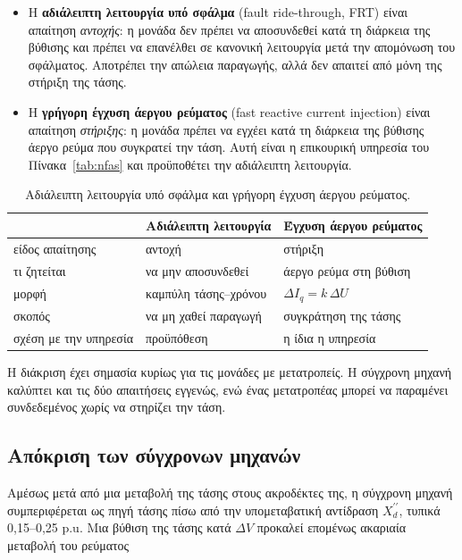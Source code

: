 \begin{itemize}
\item Η \textbf{αδιάλειπτη λειτουργία υπό σφάλμα} (fault ride-through, FRT) είναι
      απαίτηση \emph{αντοχής}: η μονάδα δεν πρέπει να αποσυνδεθεί κατά τη διάρκεια της
      βύθισης και πρέπει να επανέλθει σε κανονική λειτουργία μετά την απομόνωση του σφάλματος.
      Αποτρέπει την απώλεια παραγωγής, αλλά δεν απαιτεί από μόνη της στήριξη της τάσης.
\item Η \textbf{γρήγορη έγχυση άεργου ρεύματος} (fast reactive current injection) είναι
      απαίτηση \emph{στήριξης}: η μονάδα πρέπει να εγχέει κατά τη διάρκεια της βύθισης άεργο
      ρεύμα που συγκρατεί την τάση. Αυτή είναι η επικουρική υπηρεσία του
      Πίνακα~\ref{tab:nfas} και προϋποθέτει την αδιάλειπτη λειτουργία.
\end{itemize}

\begin{table}[!htbp]
\centering
\begin{tabular}{lll}
\hline
 & Αδιάλειπτη λειτουργία & Έγχυση άεργου ρεύματος \\
\hline
είδος απαίτησης & αντοχή & στήριξη \\
τι ζητείται & να μην αποσυνδεθεί & άεργο ρεύμα στη βύθιση \\
μορφή & καμπύλη τάσης--χρόνου & $\Delta I_q = k\,\Delta U$ \\
σκοπός & να μη χαθεί παραγωγή & συγκράτηση της τάσης \\
σχέση με την υπηρεσία & προϋπόθεση & η ίδια η υπηρεσία \\
\hline
\end{tabular}
\caption{Αδιάλειπτη λειτουργία υπό σφάλμα και γρήγορη έγχυση άεργου ρεύματος.}
\label{tab:frt-vs-q}
\end{table}

Η διάκριση έχει σημασία κυρίως για τις μονάδες με μετατροπείς. Η σύγχρονη μηχανή καλύπτει και
τις δύο απαιτήσεις εγγενώς, ενώ ένας μετατροπέας μπορεί να παραμένει συνδεδεμένος χωρίς να
στηρίζει την τάση.

\subsection{Απόκριση των σύγχρονων μηχανών}
\label{sec:sm-response}

Αμέσως μετά από μια μεταβολή της τάσης στους ακροδέκτες της, η σύγχρονη μηχανή συμπεριφέρεται
ως πηγή τάσης πίσω από την υπομεταβατική αντίδραση $X_d^{\prime\prime}$, τυπικά 0,15--0,25 p.u.
Μια βύθιση της τάσης κατά $\Delta V$ προκαλεί επομένως ακαριαία μεταβολή του ρεύματος

